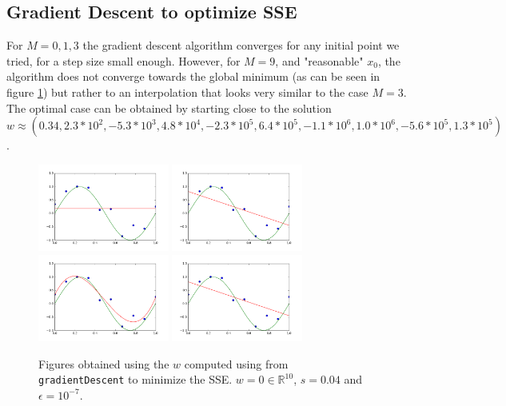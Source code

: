 \subsection{Gradient Descent to optimize SSE}
For $M = 0, 1, 3$ the gradient descent algorithm converges for any initial point we tried, for a step size small enough. However, for $M=9$, and "reasonable" $x_0$, the algorithm does not converge towards the global minimum (as can be seen in figure \ref{Bishop}) but rather to an interpolation that looks very similar to the case $M=3$. The optimal case can be obtained by starting close to the solution $w \approx (  0.34, 2.3*10^2,  -5.3*10^3,   4.8*10^4,  -2.3*10^5,   6.4*10^5,  -1.1*10^6,   1.0*10^6, -5.6*10^5,   1.3*10^5)$.
\begin{figure}[h!]
  \centering
 \includegraphics[width=4.3cm]{../Figures/Q2/M0bis.png}
\includegraphics[width=4.3cm]{../Figures/Q2/M1bis.png}
 \includegraphics[width=4.3cm]{../Figures/Q2/M3bis.png}
 \includegraphics[width=4.3cm]{../Figures/Q2/M9quat.png}
\caption{Figures obtained using the $w$ computed using from {\tt gradientDescent} to minimize the SSE. $w = 0 \in \mathbb{R}^10$, $s= 0.04$ and $\epsilon = 10^{-7}$.}
\label{Bishop}
\end{figure}

